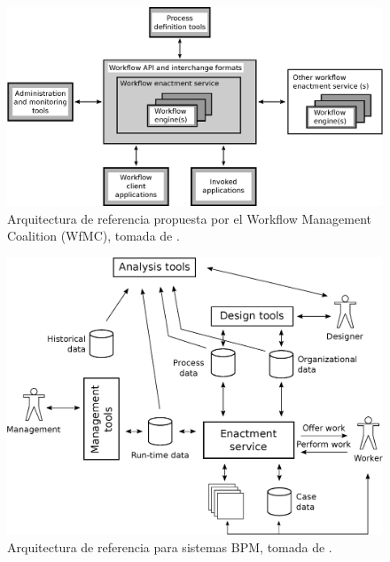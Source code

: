 \begin{figure}[htbp!] 
    \centering    
    \includegraphics[width=1.0\textwidth]{Chapter1/Figs/Vector/Figure_referenceWfMC.eps}
    \caption[Arquitectura de referencia propuesta por el Workflow Management Coalition (WfMC)]{Arquitectura de referencia propuesta por el Workflow Management Coalition (WfMC), tomada de \cite[Fig.~15]{VanderAalst2004}.}
    \label{fig:ReferenceWfMC}
\end{figure}

\begin{figure}[htbp!] 
    \centering    
    \includegraphics[width=1.0\textwidth]{Chapter1/Figs/Vector/Figure_referenceBPM}
    \caption[Arquitectura de referencia para sistemas BPM]{Arquitectura de referencia para sistemas BPM, tomada de \cite[Fig.~15]{VanderAalst2013}.}
    \label{fig:ReferenceBPM}
\end{figure}

